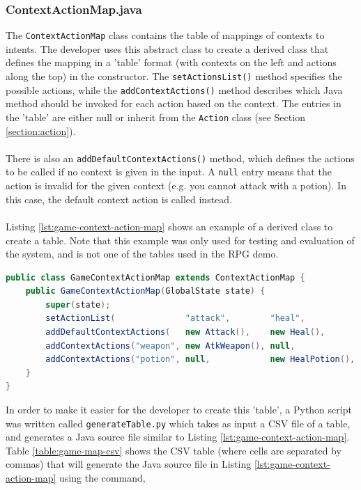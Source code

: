 \documentclass[12pt]{article}
\begin{document}
\subsubsection{ContextActionMap.java}
\label{section:context-action-map}

The \texttt{ContextActionMap} class contains the table of mappings of contexts to intents. The developer uses this abstract class to create a derived class that defines the mapping in a 'table' format (with contexts on the left and actions along the top) in the constructor. The \texttt{setActionsList()} method specifies the possible actions, while the \texttt{addContextActions()} method describes which Java method should be invoked for each action based on the context. The entries in the 'table' are either null or inherit from the \texttt{Action} class (see Section \ref{section:action}).
\\
\\
There is also an \texttt{addDefaultContextActions()} method, which defines the actions to be called if no context is given in the input. A \texttt{null} entry means that the action is invalid for the given context (e.g. you cannot attack with a potion). In this case, the default context action is called instead.
\\
\\
Listing \ref{lst:game-context-action-map} shows an example of a derived class to create a table. Note that this example was only used for testing and evaluation of the system, and is not one of the tables used in the RPG demo.

\begin{lstlisting}[language=Java, caption=Example of a ContextActionMap, label={lst:game-context-action-map}]
public class GameContextActionMap extends ContextActionMap {
    public GameContextActionMap(GlobalState state) {
        super(state);
        setActionList(              "attack",        "heal",           "move");
        addDefaultContextActions(   new Attack(),    new Heal(),       new Move());
        addContextActions("weapon", new AtkWeapon(), null,             null);
        addContextActions("potion", null,            new HealPotion(), null);
    }
}
\end{lstlisting}

In order to make it easier for the developer to create this 'table', a Python script was written called \texttt{generateTable.py} which takes as input a CSV file of a table, and generates a Java source file similar to Listing \ref{lst:game-context-action-map}. Table \ref{table:game-map-csv} shows the CSV table (where cells are separated by commas) that will generate the Java source file in Listing \ref{lst:game-context-action-map} using the command, 
\end{document}
